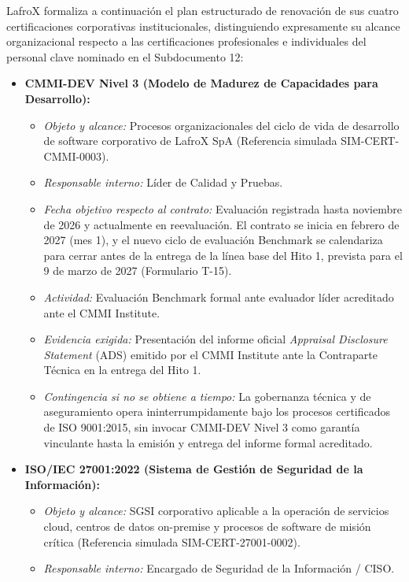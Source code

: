 LafroX formaliza a continuación el plan estructurado de renovación de sus cuatro certificaciones corporativas institucionales, distinguiendo expresamente su alcance organizacional respecto a las certificaciones profesionales e individuales del personal clave nominado en el Subdocumento 12:
\begin{itemize}
    \item \textbf{CMMI-DEV Nivel 3 (Modelo de Madurez de Capacidades para Desarrollo):}
    \begin{itemize}
        \item \textit{Objeto y alcance:} Procesos organizacionales del ciclo de vida de desarrollo de software corporativo de LafroX SpA (Referencia simulada SIM-CERT-CMMI-0003).
        \item \textit{Responsable interno:} Líder de Calidad y Pruebas.
        \item \textit{Fecha objetivo respecto al contrato:} Evaluación registrada hasta noviembre de 2026 y actualmente en reevaluación. El contrato se inicia en febrero de 2027 (mes 1), y el nuevo ciclo de evaluación Benchmark se calendariza para cerrar antes de la entrega de la línea base del Hito 1, prevista para el 9 de marzo de 2027 (Formulario T-15).
        \item \textit{Actividad:} Evaluación Benchmark formal ante evaluador líder acreditado ante el CMMI Institute.
        \item \textit{Evidencia exigida:} Presentación del informe oficial \textit{Appraisal Disclosure Statement} (ADS) emitido por el CMMI Institute ante la Contraparte Técnica en la entrega del Hito 1.
        \item \textit{Contingencia si no se obtiene a tiempo:} La gobernanza técnica y de aseguramiento opera ininterrumpidamente bajo los procesos certificados de ISO 9001:2015, sin invocar CMMI-DEV Nivel 3 como garantía vinculante hasta la emisión y entrega del informe formal acreditado.
    \end{itemize}
    \item \textbf{ISO/IEC 27001:2022 (Sistema de Gestión de Seguridad de la Información):}
    \begin{itemize}
        \item \textit{Objeto y alcance:} SGSI corporativo aplicable a la operación de servicios cloud, centros de datos on-premise y procesos de software de misión crítica (Referencia simulada SIM-CERT-27001-0002).
        \item \textit{Responsable interno:} Encargado de Seguridad de la Información / CISO.

\end{itemize}
\end{itemize}
